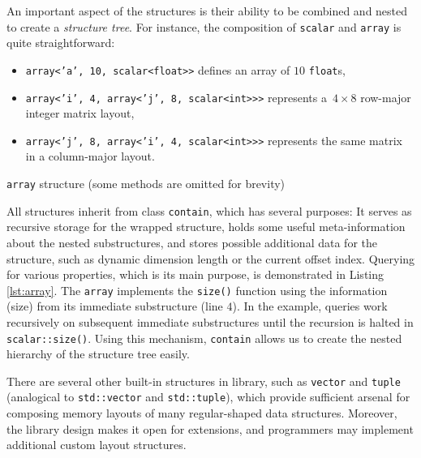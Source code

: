 An important aspect of the structures is their ability to be combined and nested to create a \emph{structure tree}. For instance, the composition of \texttt{scalar} and \texttt{array} is quite straightforward:
\begin{itemize}
\item\texttt{array<'a', 10, scalar<float>>}
defines an array of $10$ \texttt{float}s,
\item\texttt{array<'i', 4, array<'j', 8, scalar<int>>>}
represents a~$4\times8$ row-major integer matrix layout,
\item\sloppy\texttt{array<'j', 8, array<'i', 4, scalar<int>>>}
represents the same matrix in a column-major layout.
\end{itemize}

\begin{listing}[h]
  \vspace{-10pt}
  \vspace{-20pt}
  \caption{\Noarr{} \texttt{array} structure (some methods are omitted for brevity)}
  \label{lst:array}
\end{listing}

All structures inherit from class \texttt{contain}, which has several purposes: It serves as recursive storage for the wrapped structure, holds some useful meta-information about the nested substructures, and stores possible additional data for the structure, such as dynamic dimension length or the current offset index. Querying for various properties, which is its main purpose, is demonstrated in Listing \ref{lst:array}. The \texttt{array} implements the \texttt{size()} function using the information (size) from its immediate substructure (line $4$). In the example, queries work recursively on subsequent immediate substructures until the recursion is halted in \texttt{scalar::size()}. Using this mechanism, \texttt{contain} allows us to create the nested hierarchy of the structure tree easily.

There are several other built-in structures in \Noarr{} library, such as \texttt{vector} and \texttt{tuple} (analogical to \texttt{std::vector} and \texttt{std::tuple}), which provide sufficient arsenal for composing memory layouts of many regular-shaped data structures. Moreover, the library design makes it open for extensions, and programmers may implement additional custom layout structures.


